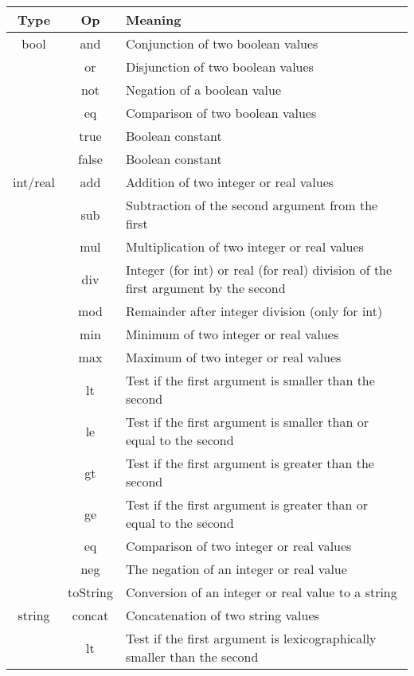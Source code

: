 \begin{table}
\begin{center}
\begin{tabular}{|c|c|l|}
\hline\hline
\bf Type & \bf Op & \bf Meaning \\
\hline
\sf bool
  & \sf and & Conjunction of two boolean values \\
  & \sf or  & Disjunction of two boolean values \\
  & \sf not & Negation of a boolean value \\
  & \sf eq & Comparison of two boolean values \\
\cline{2-3}
  & \sf true & Boolean constant \\
  & \sf false & Boolean constant \\
\hline
\textsf{int}/\textsf{real}
  & \sf add & Addition of two integer or real values  \\
  & \sf sub & Subtraction of the second argument from the first \\
  & \sf mul & Multiplication of two integer or real values \\
  & \sf div & Integer (for \textsf{int}) or real (for \textsf{real}) division of the first argument by the second \\
  & \sf mod & Remainder after integer division (only for \textsf{int}) \\
  & \sf min & Minimum of two integer or real values \\
  & \sf max & Maximum of two integer or real values \\
  & \sf lt & Test if the first argument is
  smaller than the second \\
  & \sf le & Test if the first argument is
  smaller than or equal to the second \\
  & \sf gt & Test if the first argument is
  greater than the second \\
  & \sf ge & Test if the first argument is
  greater than or equal to the second \\
  & \sf eq & Comparison of two integer or real values \\
  & \sf neg & The negation of an integer or real value \\
  & \sf toString & Conversion of an integer or real value to a string \\
\hline
\sf string
  & \sf concat & Concatenation of two string values \\
  & \sf lt & Test if the first argument is
  lexicographically smaller than the second \\

\end{tabular}
\end{center}
\end{table}
